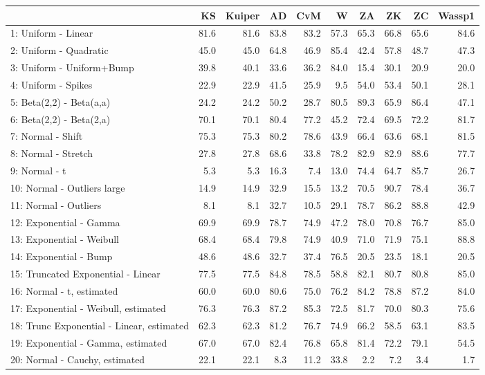 \documentclass[
]{article}
\begin{document}
\begin{table}[H]
\centering\begingroup\fontsize{15}{17}\selectfont

\begin{tabular}{l|r|r|r|r|r|r|r|r|r}
\hline
  & KS & Kuiper & AD & CvM & W & ZA & ZK & ZC & Wassp1\\
\hline
1: Uniform - Linear & 81.6 & 81.6 & 83.8 & 83.2 & 57.3 & 65.3 & 66.8 & 65.6 & 84.6\\
\hline
2: Uniform - Quadratic & 45.0 & 45.0 & 64.8 & 46.9 & 85.4 & 42.4 & 57.8 & 48.7 & 47.3\\
\hline
3: Uniform - Uniform+Bump & 39.8 & 40.1 & 33.6 & 36.2 & 84.0 & 15.4 & 30.1 & 20.9 & 20.0\\
\hline
4: Uniform - Spikes & 22.9 & 22.9 & 41.5 & 25.9 & 9.5 & 54.0 & 53.4 & 50.1 & 28.1\\
\hline
5: Beta(2,2) - Beta(a,a) & 24.2 & 24.2 & 50.2 & 28.7 & 80.5 & 89.3 & 65.9 & 86.4 & 47.1\\
\hline
6: Beta(2,2) - Beta(2,a) & 70.1 & 70.1 & 80.4 & 77.2 & 45.2 & 72.4 & 69.5 & 72.2 & 81.7\\
\hline
7: Normal - Shift & 75.3 & 75.3 & 80.2 & 78.6 & 43.9 & 66.4 & 63.6 & 68.1 & 81.5\\
\hline
8: Normal  - Stretch & 27.8 & 27.8 & 68.6 & 33.8 & 78.2 & 82.9 & 82.9 & 88.6 & 77.7\\
\hline
9: Normal  - t & 5.3 & 5.3 & 16.3 & 7.4 & 13.0 & 74.4 & 64.7 & 85.7 & 26.7\\
\hline
10: Normal  - Outliers large & 14.9 & 14.9 & 32.9 & 15.5 & 13.2 & 70.5 & 90.7 & 78.4 & 36.7\\
\hline
11: Normal  - Outliers & 8.1 & 8.1 & 32.7 & 10.5 & 29.1 & 78.7 & 86.2 & 88.8 & 42.9\\
\hline
12: Exponential - Gamma & 69.9 & 69.9 & 78.7 & 74.9 & 47.2 & 78.0 & 70.8 & 76.7 & 85.0\\
\hline
13: Exponential - Weibull & 68.4 & 68.4 & 79.8 & 74.9 & 40.9 & 71.0 & 71.9 & 75.1 & 88.8\\
\hline
14: Exponential - Bump & 48.6 & 48.6 & 32.7 & 37.4 & 76.5 & 20.5 & 23.5 & 18.1 & 20.5\\
\hline
15: Truncated Exponential - Linear & 77.5 & 77.5 & 84.8 & 78.5 & 58.8 & 82.1 & 80.7 & 80.8 & 85.0\\
\hline
16: Normal  - t, estimated & 60.0 & 60.0 & 80.6 & 75.0 & 76.2 & 84.2 & 78.8 & 87.2 & 84.0\\
\hline
17: Exponential - Weibull, estimated & 76.3 & 76.3 & 87.2 & 85.3 & 72.5 & 81.7 & 70.0 & 80.3 & 75.6\\
\hline
18: Trunc Exponential - Linear, estimated & 62.3 & 62.3 & 81.2 & 76.7 & 74.9 & 66.2 & 58.5 & 63.1 & 83.5\\
\hline
19: Exponential - Gamma, estimated & 67.0 & 67.0 & 82.4 & 76.8 & 65.8 & 81.4 & 72.2 & 79.1 & 54.5\\
\hline
20: Normal  - Cauchy, estimated & 22.1 & 22.1 & 8.3 & 11.2 & 33.8 & 2.2 & 7.2 & 3.4 & 1.7\\
\hline
\end{tabular}
\endgroup{}
\end{table}
\end{document}
